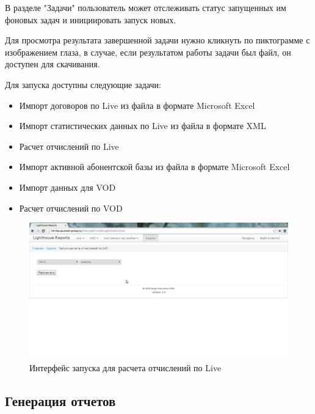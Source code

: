 В разделе "Задачи" пользователь может отслеживать статус запущенных им фоновых задач
и инициировать запуск новых.

Для просмотра результата завершенной задачи нужно кликнуть по пиктограмме с изображением глаза,
в случае, если результатом работы задачи был файл, он доступен для скачивания.

Для запуска доступны следующие задачи:
\begin{itemize}
\item{
  Импорт договоров по Live из файла в формате Microsoft Excel
}
\item{
  Импорт статистических данных по Live из файла в формате XML
}
\item{
  Расчет отчислений по Live
}
\item{
  Импорт активной абонентской базы из файла в формате Microsoft Excel
}
\item{
  Импорт данных для VOD 
}
\item{
  Расчет отчислений по VOD
}
\end{itemize}

\begin{figure}[!ht]
\begin{center}
\hspace*{-1cm} \includegraphics[scale=0.35, trim=0mm 70mm 250mm 10mm, clip]{../resources/screens/deduct_start.png}
\caption{Интерфейс запуска для расчета отчислений по Live}
\end{center}
\end{figure}

\subsection*{Генерация отчетов}
